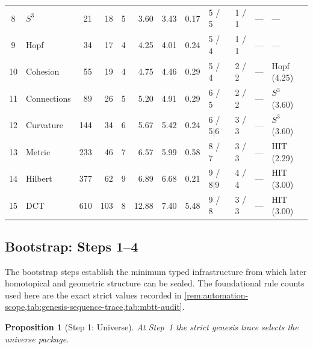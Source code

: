 \documentclass[11pt,a4paper]{article}
\theoremstyle{plain}
\newtheorem{proposition}[theorem]{Proposition}
\theoremstyle{definition}
\theoremstyle{remark}
\begin{document}
\begin{table}[tbp]
\begin{tabular}{@{}c l r r r r r r l l >{\raggedright\arraybackslash}p{1.6cm} >{\raggedright\arraybackslash}p{1.6cm}@{}}
8  & $S^3$       & 21  & 18 & 5 & 3.60 & 3.43 & 0.17 & 5 / 5   & 1 / 1      & --- & --- \\
9  & Hopf        & 34  & 17 & 4 & 4.25 & 4.01 & 0.24 & 5 / 4   & 1 / 1      & --- & --- \\
10 & Cohesion    & 55  & 19 & 4 & 4.75 & 4.46 & 0.29 & 5 / 4   & 2 / 2      & --- & Hopf (4.25) \\
11 & Connections & 89  & 26  & 5 & 5.20  & 4.91 & 0.29 & 6 / 5   & 2 / 2      & --- & $S^3$ (3.60) \\
12 & Curvature   & 144 & 34  & 6 & 5.67  & 5.42 & 0.24 & 6 / 5|6 & 3 / 3      & --- & $S^3$ (3.60) \\
13 & Metric      & 233 & 46  & 7 & 6.57  & 5.99 & 0.58 & 8 / 7   & 3 / 3      & --- & HIT (2.29) \\
14 & Hilbert     & 377 & 62  & 9 & 6.89  & 6.68 & 0.21 & 9 / 8|9 & 4 / 4      & --- & HIT (3.00) \\
15 & DCT         & 610 & 103 & 8 & 12.88 & 7.40 & 5.48 & 9 / 8   & 3 / 3      & --- & HIT (3.00) \\
\bottomrule
\end{tabular}
\end{table}

\subsection{Bootstrap: Steps 1--4}
\label{subsec:genesis-bootstrap-proof}

The bootstrap steps establish the minimum typed infrastructure from which later
homotopical and geometric structure can be sealed.
The foundational rule counts used here are the exact strict values recorded in
\cref{rem:automation-scope,tab:genesis-sequence-trace,tab:mbtt-audit}.

\begin{proposition}[Step 1: Universe]
\label{prop:genesis-step1}
At Step~1 the strict genesis trace selects the universe package.
\end{proposition}
\end{document}
